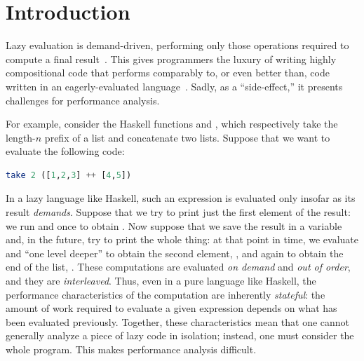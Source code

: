 \section{Introduction}\label{sec:intro}

Lazy evaluation is demand-driven, performing only those operations required to
compute a final result~\cite{launchbury1993}. This gives programmers the luxury
of writing highly compositional code that performs comparably to, or even better
than, code written in an eagerly-evaluated language~\cite{fp-matters}. Sadly, as
a ``side-effect,'' it presents challenges for performance analysis.

For example, consider the Haskell functions  and \cdh{(++)}, which
respectively take the length-\(n\) prefix of a list and concatenate two lists.
Suppose that we want to evaluate the following code:
\begin{lstlisting}[language=Haskell]
take 2 ([1,2,3] ++ [4,5]) 
\end{lstlisting}
In a lazy language like Haskell, such an expression is evaluated only insofar as
its result \emph{demands}. Suppose that we try to print just the first element
of the result: we run  and \cdh{(++)} once to obtain . Now
suppose that we save the result in a variable and, in the future, try to print
the whole thing: at that point in time, we evaluate  and \cdh{(++)}
``one level deeper'' to obtain the second element, , and  again
to obtain the end of the list, \cdh{[]}. These computations are evaluated
\emph{on demand} and \emph{out of order}, and they are \emph{interleaved}. Thus,
even in a pure language like Haskell, the performance characteristics of the
computation are inherently \emph{stateful}: the amount of work required to
evaluate a given expression depends on what has been evaluated previously.
Together, these characteristics mean that one cannot
generally analyze a piece of lazy code in isolation; instead, one must consider
the whole program. This makes performance analysis difficult.

